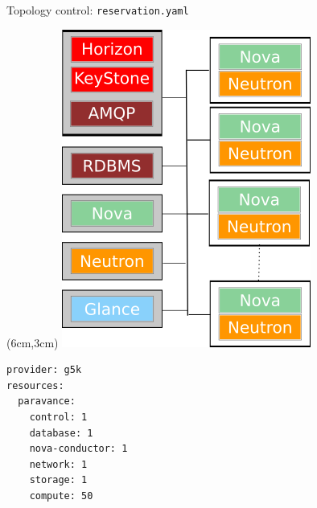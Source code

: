 \documentclass[10pt]{beamer}
\begin{document}
\begin{frame}[fragile]{Topology control: \texttt{reservation.yaml}}
  \begin{textblock*}{.4\paperwidth}(6cm,3cm)
	 \includegraphics[scale=.5]{figs/topology_control.png}
  \end{textblock*}
  \begin{lstlisting}
provider: g5k
resources:
  paravance:
    control: 1
    database: 1
    nova-conductor: 1
    network: 1
    storage: 1
    compute: 50
  \end{lstlisting}
\end{frame}
\end{document}
